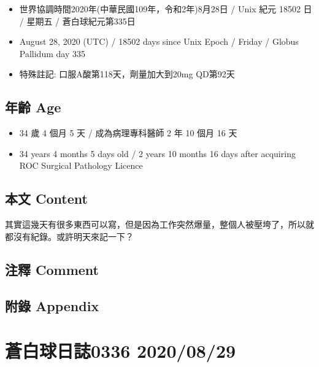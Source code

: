 \documentclass[a5paper, 11pt
]{book}
\providecommand{\tightlist}{%
  \setlength{\itemsep}{0pt}\setlength{\parskip}{0pt}}
\begin{document}
\begin{itemize}
\tightlist
\item
  世界協調時間2020年(中華民國109年，令和2年)8月28日 / Unix 紀元 18502 日
  / 星期五 / 蒼白球紀元第335日
\item
  August 28, 2020 (UTC) / 18502 days since Unix Epoch / Friday / Globus
  Pallidum day 335
\item
  特殊註記: 口服A酸第118天，劑量加大到20mg QD第92天
\end{itemize}

\hypertarget{ux5e74ux9f61-age-88}{%
\subsection{年齡 Age}\label{ux5e74ux9f61-age-88}}

\begin{itemize}
\tightlist
\item
  34 歲 4 個月 5 天 / 成為病理專科醫師 2 年 10 個月 16 天
\item
  34 years 4 months 5 days old / 2 years 10 months 16 days after
  acquiring ROC Surgical Pathology Licence
\end{itemize}

\hypertarget{ux672cux6587-content-88}{%
\subsection{本文 Content}\label{ux672cux6587-content-88}}

其實這幾天有很多東西可以寫，但是因為工作突然爆量，整個人被壓垮了，所以就都沒有紀錄。或許明天來記一下？

\hypertarget{ux6ce8ux91cb-comment-88}{%
\subsection{注釋 Comment}\label{ux6ce8ux91cb-comment-88}}

\hypertarget{ux9644ux9304-appendix-88}{%
\subsection{附錄 Appendix}\label{ux9644ux9304-appendix-88}}

\hypertarget{ux84bcux767dux7403ux65e5ux8a8c0336-20200829}{%
\section{蒼白球日誌0336
2020/08/29}\label{ux84bcux767dux7403ux65e5ux8a8c0336-20200829}}
\end{document}
